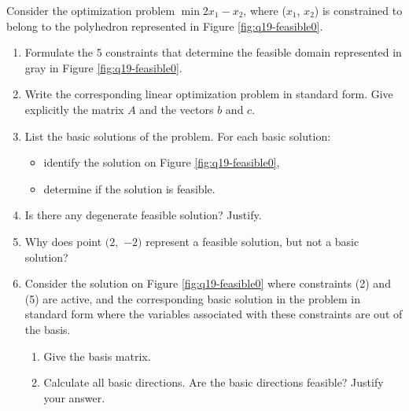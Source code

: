 Consider the optimization problem $\min 2 x_1 - x_2$, where ($x_1$, $x_2$) is constrained
to belong to the polyhedron  represented in Figure \ref{fig:q19-feasible0}.
\begin{enumerate}
\item Formulate the 5 constraints that determine the feasible domain represented in gray in Figure \ref{fig:q19-feasible0}. 


\item Write the corresponding linear optimization problem in standard form. 
Give explicitly the matrix $A$ and the vectors $b$ and $c$.


\item List the basic solutions of the problem. For each basic solution:
\begin{itemize}
\item   identify the solution on Figure \ref{fig:q19-feasible0},
\item  determine if the solution is feasible.
\end{itemize}

\item Is there any degenerate feasible solution? Justify. 

\item Why does point  $(2,$ $-2)$ represent a feasible solution, but not a basic solution?

\item  Consider the solution on Figure \ref{fig:q19-feasible0}  where constraints (2) and (5) are active,
 and the corresponding basic solution in the problem in standard form where the variables associated with these constraints are out of the basis.
 
\begin{enumerate}
\item Give the basis matrix.
\item Calculate all basic directions. Are the basic directions feasible? Justify your answer.\\
\end{enumerate}

\end{enumerate}


